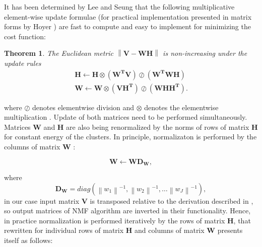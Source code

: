 \documentclass[preprint,12pt]{elsarticle}
\newcommand{\norm}[1]{\left\lVert#1\right\rVert}
\newtheorem*{theorem}{Theorem}
\begin{document}
It has been determined by Lee and Seung that the following multiplicative element-wise update formulae (for practical implementation presented in matrix forms by Hoyer \cite{hoyer2004non}) are fast to compute and easy to implement for minimizing the cost function:\newline

\begin{theorem}
The Euclidean metric $\norm{\textbf{V}-\textbf{WH}}$ is non-increasing under the update rules 
\begin{equation}
\begin{array}{ll}
     &\mathbf{H} \leftarrow \mathbf{H}\otimes(\mathbf{W^TV})\oslash
(\mathbf{W^TWH}) \quad  \\
     & \mathbf{W} \leftarrow \mathbf{W}\otimes(\mathbf{VH^T})\oslash(\mathbf{WHH^T}).
\end{array}
\end{equation}
\end{theorem}

where $\oslash$ denotes elementwise division and $\otimes$ denotes the elementwise multiplication \cite{lee2001algorithms}. Update of both matrices need to be performed simultaneously. Matrices \textbf{W} and \textbf{H} are also being renormalized by the norms of rows of matrix \textbf{H} for constant energy of the clusters. In principle, normalizaton is performed by the columns of matrix \textbf{W} \cite{cichocki2009nonnegative}:

\begin{equation}
    \mathbf{W} \leftarrow \mathbf{WD_W},
\end{equation}

where 
\begin{equation}
    \mathbf{D_W}=diag\left(\norm{w_1}^{-1},\norm{w_2}^{-1},\dots \norm{w_J}^{-1} \right), 
\end{equation}
in our case input matrix \textbf{V} is transposed relative to the derivation described in \cite{cichocki2009nonnegative}, so output matrices of NMF algorithm are inverted in their functionality. Hence, in practice normalization is performed iteratively by the rows of matrix \textbf{H}, that rewritten for individual rows of matrix \textbf{H} and columns of matrix \textbf{W} presents itself as follows:
\end{document}
